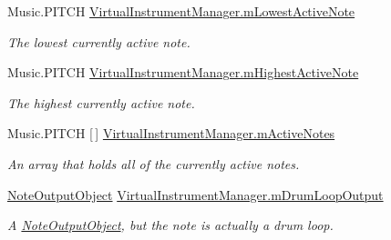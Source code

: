 \begin{DoxyCompactItemize}
\mbox{\label{group___virtual_instrument_manager_event_types_ga5e3a5116e0dabb37e0ea21d73ac1567e}} 
Music.\+P\+I\+T\+CH \hyperlink{group___virtual_instrument_manager_event_types_ga5e3a5116e0dabb37e0ea21d73ac1567e}{Virtual\+Instrument\+Manager.\+m\+Lowest\+Active\+Note}
\begin{DoxyCompactList}\small\item\em The lowest currently active note. \end{DoxyCompactList}\item 
\mbox{\label{group___virtual_instrument_manager_event_types_ga73a09a4e4f09c0e5b3871dc9ad6c757e}} 
Music.\+P\+I\+T\+CH \hyperlink{group___virtual_instrument_manager_event_types_ga73a09a4e4f09c0e5b3871dc9ad6c757e}{Virtual\+Instrument\+Manager.\+m\+Highest\+Active\+Note}
\begin{DoxyCompactList}\small\item\em The highest currently active note. \end{DoxyCompactList}\item 
\mbox{\label{group___virtual_instrument_manager_event_types_ga5cedf9995d59b416412677e6004b659c}} 
Music.\+P\+I\+T\+CH \mbox{[}$\,$\mbox{]} \hyperlink{group___virtual_instrument_manager_event_types_ga5cedf9995d59b416412677e6004b659c}{Virtual\+Instrument\+Manager.\+m\+Active\+Notes}
\begin{DoxyCompactList}\small\item\em An array that holds all of the currently active notes. \end{DoxyCompactList}\item 
\mbox{\label{group___virtual_instrument_manager_event_types_ga5f71cb71d240042312dcc13b481b068d}} 
\hyperlink{class_note_output_object}{Note\+Output\+Object} \hyperlink{group___virtual_instrument_manager_event_types_ga5f71cb71d240042312dcc13b481b068d}{Virtual\+Instrument\+Manager.\+m\+Drum\+Loop\+Output}
\begin{DoxyCompactList}\small\item\em A \hyperlink{class_note_output_object}{Note\+Output\+Object}, but the note is actually a drum loop. \end{DoxyCompactList}\item 

\end{DoxyCompactItemize}

